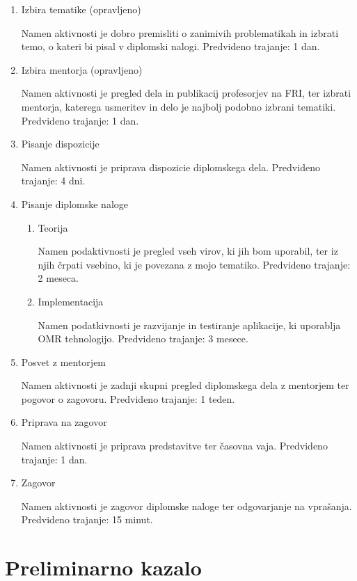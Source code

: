 \documentclass[11pt,a4paper]{article}
\begin{document}
\begin{enumerate}
\item Izbira tematike (opravljeno)

Namen aktivnosti je dobro premisliti o zanimivih problematikah in izbrati temo, o kateri bi pisal v diplomski nalogi. Predvideno trajanje: 1 dan.
\item Izbira mentorja (opravljeno)

Namen aktivnosti je pregled dela in publikacij profesorjev na FRI, ter izbrati mentorja, katerega usmeritev in delo je najbolj podobno izbrani tematiki. Predvideno trajanje: 1 dan.
\item Pisanje dispozicije

Namen aktivnosti je priprava dispozicie diplomskega dela. Predvideno trajanje: 4 dni.

\item Pisanje diplomske naloge
	\begin{enumerate}
	\item Teorija
	
	Namen podaktivnosti je pregled vseh virov, ki jih bom uporabil, ter iz njih črpati vsebino, ki je povezana z mojo tematiko. Predvideno trajanje: 2 meseca.
	\item Implementacija
	
	Namen podatkivnosti je razvijanje in testiranje aplikacije, ki uporablja OMR tehnologijo. Predvideno trajanje: 3 mesece.
	\end{enumerate}
	
\item Posvet z mentorjem 

Namen aktivnosti je zadnji skupni pregled diplomskega dela z mentorjem ter pogovor o zagovoru. Predvideno trajanje: 1 teden.

\item Priprava na zagovor

Namen aktivnosti je priprava predstavitve ter časovna vaja. Predvideno trajanje: 1 dan.
\item Zagovor

Namen aktivnosti je zagovor diplomske naloge ter odgovarjanje na vprašanja. Predvideno trajanje: 15 minut.
\end{enumerate}

\section{Preliminarno kazalo}
\end{document}
